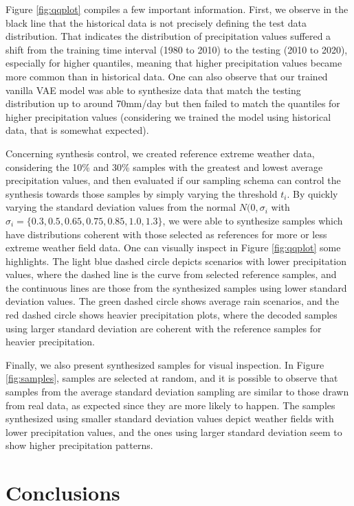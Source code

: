 \documentclass{article}
\begin{document}
Figure \ref{fig:qqplot} compiles a few important information. First, we observe in the black line that the historical data is not precisely defining the test data distribution. That indicates the distribution of precipitation values suffered a shift from the training time interval (1980 to 2010) to the testing (2010 to 2020), especially for higher quantiles, meaning that higher precipitation values became more common than in historical data. One can also observe that our trained vanilla VAE model was able to synthesize data that match the testing distribution up to around 70mm/day but then failed to match the quantiles for higher precipitation values (considering we trained the model using historical data, that is somewhat expected). 

Concerning synthesis control, we created reference extreme weather data, considering the 10\% and 30\% samples with the greatest and lowest average precipitation values, and then evaluated if our sampling schema can control the synthesis towards those samples by simply varying the threshold $t_i$. By quickly varying the standard deviation values from the normal $N(0,\sigma_i$ with $\sigma_i=\{0.3,0.5,0.65,0.75,0.85,1.0,1.3\}$, we were able to synthesize samples which have distributions coherent with those selected as references for more or less extreme weather field data. One can visually inspect in Figure \ref{fig:qqplot} some highlights. The light blue dashed circle depicts scenarios with lower precipitation values, where the dashed line is the curve from selected reference samples, and the continuous lines are those from the synthesized samples using lower standard deviation values. The green dashed circle shows average rain scenarios, and the red dashed circle shows heavier precipitation plots, where the decoded samples using larger standard deviation are coherent with the reference samples for heavier precipitation.

Finally, we also present synthesized samples for visual inspection. In Figure \ref{fig:samples}, samples are selected at random, and it is possible to observe that samples from the average standard deviation sampling are similar to those drawn from real data, as expected since they are more likely to happen. The samples synthesized using smaller standard deviation values depict weather fields with lower precipitation values, and the ones using larger standard deviation seem to show higher precipitation patterns.  

\section{Conclusions}
\end{document}
